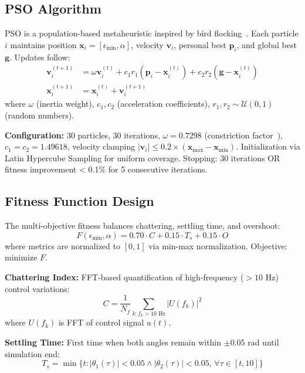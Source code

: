 \documentclass[conference]{IEEEtran}
\begin{document}
\subsection{PSO Algorithm}

PSO is a population-based metaheuristic inspired by bird flocking~\cite{kennedy1995pso}. Each particle $i$ maintains position $\mathbf{x}_i = [\epsilon_{\min}, \alpha]$, velocity $\mathbf{v}_i$, personal best $\mathbf{p}_i$, and global best $\mathbf{g}$. Updates follow:
\begin{align}
\mathbf{v}_i^{(t+1)} &= \omega \mathbf{v}_i^{(t)} + c_1 r_1 (\mathbf{p}_i - \mathbf{x}_i^{(t)}) + c_2 r_2 (\mathbf{g} - \mathbf{x}_i^{(t)}) \nonumber \\
\mathbf{x}_i^{(t+1)} &= \mathbf{x}_i^{(t)} + \mathbf{v}_i^{(t+1)} \nonumber
\end{align}
where $\omega$ (inertia weight), $c_1, c_2$ (acceleration coefficients), $r_1, r_2 \sim \mathcal{U}(0,1)$ (random numbers).

\textbf{Configuration:} 30 particles, 30 iterations, $\omega = 0.7298$ (constriction factor~\cite{clerc2002constriction}), $c_1 = c_2 = 1.49618$, velocity clamping $|\mathbf{v}_i| \leq 0.2 \times (\mathbf{x}_{\max} - \mathbf{x}_{\min})$. Initialization via Latin Hypercube Sampling for uniform coverage. Stopping: 30 iterations OR fitness improvement < 0.1\% for 5 consecutive iterations.

\subsection{Fitness Function Design}

The multi-objective fitness balances chattering, settling time, and overshoot:
\begin{equation}
F(\epsilon_{\min}, \alpha) = 0.70 \cdot C + 0.15 \cdot T_s + 0.15 \cdot O
\end{equation}
where metrics are normalized to $[0, 1]$ via min-max normalization. Objective: minimize $F$.

\textbf{Chattering Index:} FFT-based quantification of high-frequency ($>10$ Hz) control variations:
\begin{equation}
C = \frac{1}{N_f} \sum_{k: f_k > 10 \text{ Hz}} |U(f_k)|^2
\end{equation}
where $U(f_k)$ is FFT of control signal $u(t)$.

\textbf{Settling Time:} First time when both angles remain within $\pm$0.05 rad until simulation end:
\begin{equation}
T_s = \min\{t : |\theta_1(\tau)| < 0.05 \wedge |\theta_2(\tau)| < 0.05, \, \forall \tau \in [t, 10]\}
\end{equation}
\end{document}
